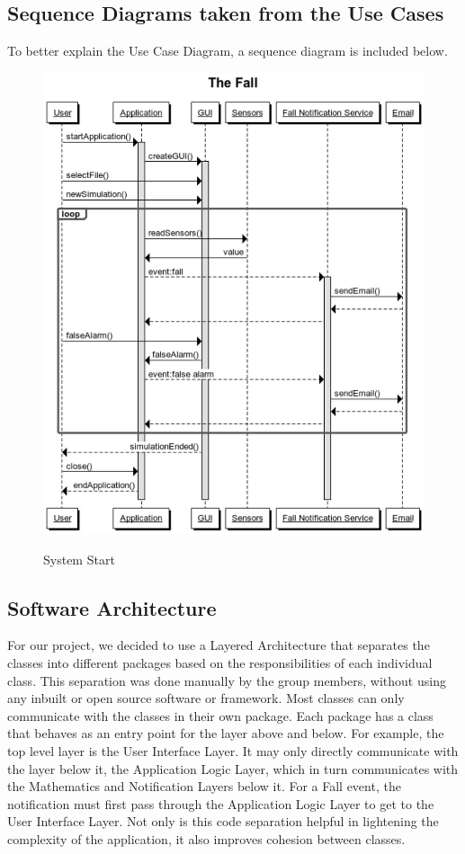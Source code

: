 \documentclass[hidelinks,conference,12pt]{IEEETran}
\begin{document}
\subsection{Sequence Diagrams taken from the Use Cases}
To better explain the Use Case Diagram, a sequence diagram is included below.

\FloatBarrier
\begin{figure}[!h]
	\centering
	\caption{System Start}
	\includegraphics[scale=0.29]{images/Seq_Diag.jpeg}
	\label{img:start}
\end{figure}
\FloatBarrier

\subsection{Software Architecture}
For our project, we decided to use a Layered Architecture that separates the classes into different packages based on the responsibilities of each individual class. This separation was done manually by the group members, without using any inbuilt or open source software or framework.
Most classes can only communicate with the classes in their own package. Each package has a class that behaves as an entry point for the layer above and below. For example, the top level layer is the User Interface Layer. It may only directly communicate with the layer below it, the Application Logic Layer, which in turn communicates with the Mathematics and Notification Layers below it.
 For a Fall event, the notification must first pass through the Application Logic Layer to get to the User Interface Layer. Not only is this code separation helpful in lightening the complexity of the application, it also improves cohesion between classes. \\
 
\end{document}
